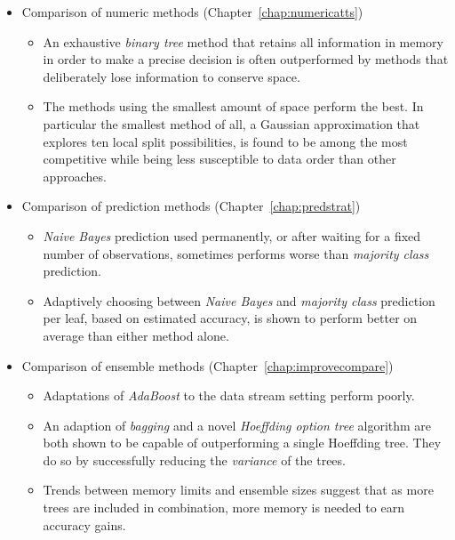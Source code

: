 \begin{enumerate}
\begin{itemize}

\item Comparison of numeric methods (Chapter~\ref{chap:numericatts})
\begin{itemize}
\item An exhaustive {\em binary tree} method that retains all information in memory in order to make a precise decision is often outperformed by methods that deliberately lose information to conserve space.
\item The methods using the smallest amount of space perform the best. In particular the smallest method of all, a Gaussian approximation that explores ten local split possibilities, is found to be among the most competitive while being less susceptible to data order than other approaches.
\end{itemize}

\item Comparison of prediction methods (Chapter~\ref{chap:predstrat})
\begin{itemize}
\item {\em Naive Bayes} prediction used permanently, or after waiting for a fixed number of observations, sometimes performs worse than {\em majority class} prediction.
\item Adaptively choosing between {\em Naive Bayes} and {\em majority class} prediction per leaf, based on estimated accuracy, is shown to perform better on average than either method alone.
\end{itemize}

\item Comparison of ensemble methods (Chapter~\ref{chap:improvecompare})
\begin{itemize}
\item Adaptations of {\em AdaBoost} to the data stream setting perform poorly.
\item An adaption of {\em bagging} and a novel {\em Hoeffding option tree} algorithm are both shown to be capable of outperforming a single Hoeffding tree. They do so by successfully reducing the {\em variance} of the trees.
\item Trends between memory limits and ensemble sizes suggest that as more trees are included in combination, more memory is needed to earn accuracy gains.
\end{itemize}


\end{itemize}
\end{enumerate}
